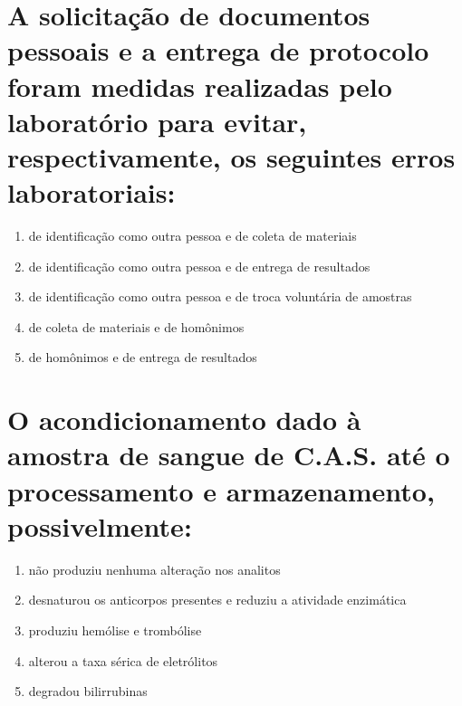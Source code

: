 \documentclass[11pt,notitlepage]{article}
\begin{document}
\section{A solicitação de documentos pessoais e a entrega de protocolo foram medidas realizadas pelo laboratório para evitar, respectivamente, os seguintes erros laboratoriais:}
\begin{multicols}{2}
	\setlength{\columnseprule}{0pt}
	\begin{enumerate}[label=(\alph*)]
		\item de identificação como outra pessoa e de coleta de materiais
		\item de identificação como outra pessoa e de entrega de resultados
		\item de identificação como outra pessoa e de troca voluntária de amostras
		\item de coleta de materiais e de homônimos
		\item de homônimos e de entrega de resultados
	\end{enumerate}
\end{multicols}
\vspace{0.5cm}

\section{O acondicionamento dado à amostra de sangue de C.A.S. até o processamento e armazenamento, possivelmente:}
\begin{multicols}{2}
	\setlength{\columnseprule}{0pt}
	\begin{enumerate}[label=(\alph*)]
		\item não produziu nenhuma alteração nos analitos
		\item desnaturou os anticorpos presentes e reduziu a atividade enzimática
		\item produziu hemólise e trombólise
		\item alterou a taxa sérica de eletrólitos
		\item degradou bilirrubinas
	\end{enumerate}
\end{multicols}
\vspace{0.5cm}
\end{document}
